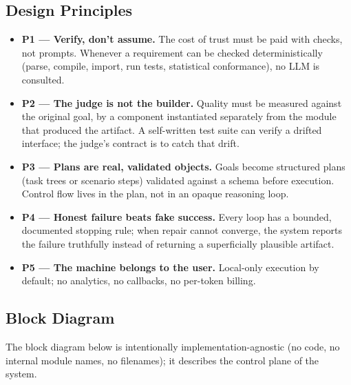\documentclass[11pt]{article}
\begin{document}
\subsection{Design Principles}
\begin{itemize}
  \item \textbf{P1 --- Verify, don't assume.} The cost of trust must be paid with checks,
        not prompts. Whenever a requirement can be checked deterministically (parse,
        compile, import, run tests, statistical conformance), no LLM is consulted.
  \item \textbf{P2 --- The judge is not the builder.} Quality must be measured against the
        original goal, by a component instantiated separately from the module that
        produced the artifact. A self-written test suite can verify a drifted interface;
        the judge's contract is to catch that drift.
  \item \textbf{P3 --- Plans are real, validated objects.} Goals become structured plans
        (task trees or scenario steps) validated against a schema before execution.
        Control flow lives in the plan, not in an opaque reasoning loop.
  \item \textbf{P4 --- Honest failure beats fake success.} Every loop has a bounded,
        documented stopping rule; when repair cannot converge, the system reports the
        failure truthfully instead of returning a superficially plausible artifact.
  \item \textbf{P5 --- The machine belongs to the user.} Local-only execution by default;
        no analytics, no callbacks, no per-token billing.
\end{itemize}

\subsection{Block Diagram}
The block diagram below is intentionally implementation-agnostic (no code, no internal
module names, no filenames); it describes the control plane of the system.
\end{document}
